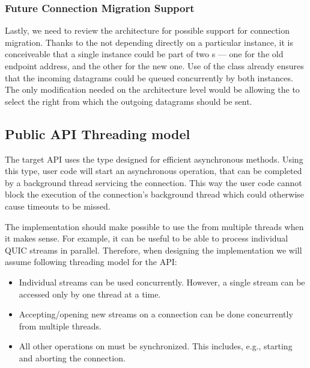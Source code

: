 \subsubsection{Future Connection Migration Support}

Lastly, we need to review the architecture for possible support for connection migration. Thanks to
the \QuicConnectionContext{} not depending directly on a particular \Socket{} instance, it is
conceiveable that a single \QuicConnectionContext{} instance could be part of two
\QuicSocketContext{}s --- one for the old endpoint address, and the other for the new one. Use of the
 class already ensures that the incoming datagrams could be queued concurrently by
both \QuicSocketContext{} instances. The only modification needed on the architecture level would be
allowing the \QuicConnectionContext{} to select the right \Socket{} from which the outgoing
datagrams should be sent.

\subsection{Public API Threading model}

The target API uses the  type designed for efficient asynchronous methods. Using
this type, user code will start an asynchronous operation, that can be completed by a background
thread servicing the connection. This way the user code cannot block the execution of the
connection's background thread which could otherwise cause timeouts to be missed.

The implementation should make possible to use the \QuicConnection{} from multiple threads when
it makes sense. For example, it can be useful to be able to process individual QUIC streams in
parallel. Therefore, when designing the implementation we will assume following threading model for
the API:

\begin{itemize}

  \item Individual streams can be used concurrently. However, a single stream can be
    accessed only by one thread at a time.

  \item Accepting/opening new streams on a connection can be done concurrently from multiple threads.

  \item All other operations on \QuicConnection{} must be synchronized. This includes, e.g.,
    starting and aborting the connection.

\end{itemize}


